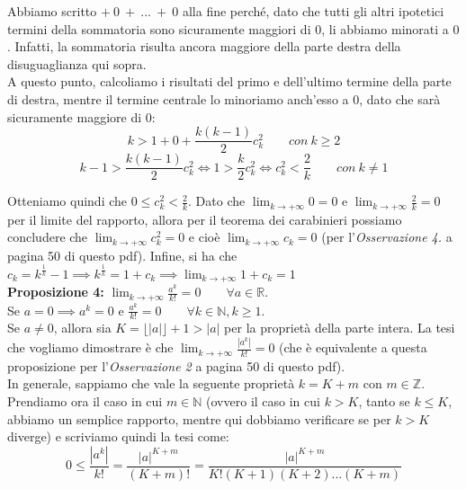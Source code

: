\documentclass{article}
\begin{document}
\noindent Abbiamo scritto $+ \ 0 \ + \ ... \ + \ 0$ alla fine perché, dato che tutti gli altri ipotetici termini della sommatoria sono sicuramente maggiori di $0$, li abbiamo minorati a $0$. Infatti, la sommatoria risulta ancora maggiore della parte destra della disuguaglianza qui sopra. \\
A questo punto, calcoliamo i risultati del primo e dell'ultimo termine della parte di destra, mentre il termine centrale lo minoriamo anch'esso a $0$, dato che sarà sicuramente maggiore di $0$:
\begin{equation*}
    k > 1 + 0 + \frac{k(k - 1)}{2}c_k^2 \qquad con \ k \geq 2
\end{equation*}
\begin{equation*}
    k - 1 > \frac{k(k - 1)}{2}c_k^2 \iff 1 > \frac{k}{2} c_k^2 \iff c_k^2 < \frac{2}{k} \qquad con \ k \neq 1
\end{equation*}

\noindent Otteniamo quindi che $0 \leq c_k^2 < \frac{2}{k}$. Dato che $\lim_{k \to +\infty} 0 = 0$ e $\lim_{k \to +\infty} \frac{2}{k} = 0$ per il limite del rapporto, allora per il teorema dei carabinieri possiamo concludere che $\lim_{k \to +\infty} c_k^2 = 0$ e cioè $\lim_{k \to +\infty} c_k = 0$ (per l'\textit{Osservazione 4.} a pagina 50 di questo pdf). Infine, si ha che $c_k = k^\frac{1}{k} - 1 \implies k^\frac{1}{k} = 1 + c_k \implies \lim_{k \to +\infty} 1 + c_k = 1$\\

\noindent\textbf{Proposizione 4:} $\lim_{k \to +\infty} \frac{a^k}{k!} = 0 \qquad \forall a \in \mathbb{R}$.\\
Se $a = 0 \implies a^k = 0$ e $\frac{a^k}{k!} = 0 \qquad \forall k \in \mathbb{N}, k \geq 1$.\\
Se $a \neq 0$, allora sia $K = \lfloor |a| \rfloor + 1 > |a|$ per la proprietà della parte intera. La tesi che vogliamo dimostrare è che $\lim_{k \to +\infty} \frac{|a^k|}{k!} = 0$ (che è equivalente a questa proposizione per l'\textit{Osservazione 2} a pagina 50 di questo pdf).\\
In generale, sappiamo che vale la seguente proprietà $k = K + m$ con $m \in \mathbb{Z}$. Prendiamo ora il caso in cui $m \in \mathbb{N}$ (ovvero il caso in cui $k > K$, tanto se $k \leq K$, abbiamo un semplice rapporto, mentre qui dobbiamo verificare se per $k > K$ diverge) e scriviamo quindi la tesi come:
\begin{equation*}
    0 \leq \frac{|a^k|}{k!} = \frac{|a|^{K + m}}{(K + m)!} = \frac{|a|^{K + m}}{K!(K + 1)(K + 2)...(K + m)}
\end{equation*}
\end{document}
